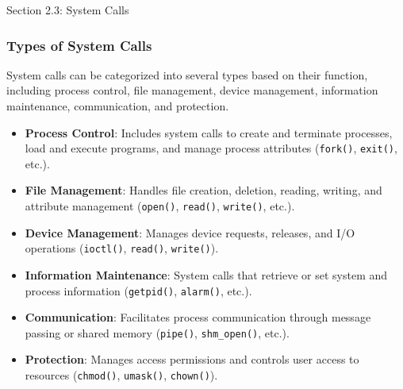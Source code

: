 \begin{notes}{Section 2.3: System Calls}
\begin{highlight}
    \end{highlight}
    
    \subsubsection*{Types of System Calls}
    
    System calls can be categorized into several types based on their function, including process control, file management, device management, information maintenance, communication, and protection.
    
    \begin{highlight}
    
    \begin{itemize}
        \item \textbf{Process Control}: Includes system calls to create and terminate processes, load and execute programs, and manage process attributes (\texttt{fork()}, \texttt{exit()}, etc.).
        \item \textbf{File Management}: Handles file creation, deletion, reading, writing, and attribute management (\texttt{open()}, \texttt{read()}, \texttt{write()}, etc.).
        \item \textbf{Device Management}: Manages device requests, releases, and I/O operations (\texttt{ioctl()}, \texttt{read()}, \texttt{write()}).
        \item \textbf{Information Maintenance}: System calls that retrieve or set system and process information (\texttt{getpid()}, \texttt{alarm()}, etc.).
        \item \textbf{Communication}: Facilitates process communication through message passing or shared memory (\texttt{pipe()}, \texttt{shm\_open()}, etc.).
        \item \textbf{Protection}: Manages access permissions and controls user access to resources (\texttt{chmod()}, \texttt{umask()}, \texttt{chown()}).
    \end{itemize}
    
    \end{highlight}
    
    \begin{highlight}
    

\end{highlight}
\end{notes}
